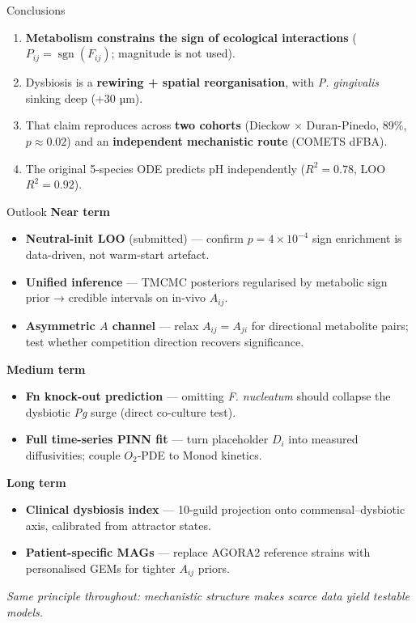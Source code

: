 \documentclass[
  ignorenonframetext,
  aspectratio=169,
]{beamer}
\providecommand{\tightlist}{%
  \setlength{\itemsep}{0pt}\setlength{\parskip}{0pt}}
\begin{document}
\begin{frame}{Conclusions}
\protect\hypertarget{conclusions}{}
\begin{enumerate}
\tightlist
\item
  \textbf{Metabolism constrains the sign of ecological interactions}
  (\(P_{ij}=\operatorname{sgn}(F_{ij})\); magnitude is not used).
\item
  Dysbiosis is a \textbf{rewiring + spatial reorganisation}, with
  \emph{P. gingivalis} sinking deep (+30 µm).
\item
  That claim reproduces across \textbf{two cohorts} (Dieckow × Duran-Pinedo,
  89\%, \(p\approx0.02\)) and an \textbf{independent mechanistic route}
  (COMETS dFBA).
\item
  The original 5-species ODE predicts pH independently (\(R^2=0.78\),
  LOO \(R^2=0.92\)).
\end{enumerate}
\end{frame}

\begin{frame}{Outlook}
\protect\hypertarget{outlook}{}
\textbf{Near term}

\begin{itemize}
\tightlist
\item
  \textbf{Neutral-init LOO} (submitted) --- confirm \(p=4\times10^{-4}\)
  sign enrichment is data-driven, not warm-start artefact.
\item
  \textbf{Unified inference} --- TMCMC posteriors regularised by
  metabolic sign prior → credible intervals on in-vivo \(A_{ij}\).
\item
  \textbf{Asymmetric \(A\) channel} --- relax \(A_{ij}=A_{ji}\) for
  directional metabolite pairs; test whether competition direction
  recovers significance.
\end{itemize}

\textbf{Medium term}

\begin{itemize}
\tightlist
\item
  \textbf{Fn knock-out prediction} --- omitting \emph{F. nucleatum}
  should collapse the dysbiotic \emph{Pg} surge (direct co-culture
  test).
\item
  \textbf{Full time-series PINN fit} --- turn placeholder \(D_i\) into
  measured diffusivities; couple \(O_2\)-PDE to Monod kinetics.
\end{itemize}

\textbf{Long term}

\begin{itemize}
\tightlist
\item
  \textbf{Clinical dysbiosis index} --- 10-guild projection onto
  commensal--dysbiotic axis, calibrated from attractor states.
\item
  \textbf{Patient-specific MAGs} --- replace AGORA2 reference strains
  with personalised GEMs for tighter \(A_{ij}\) priors.
\end{itemize}

\vspace{0.3em}

\textit{Same principle throughout: mechanistic structure makes scarce data yield testable models.}
\end{frame}
\end{document}
